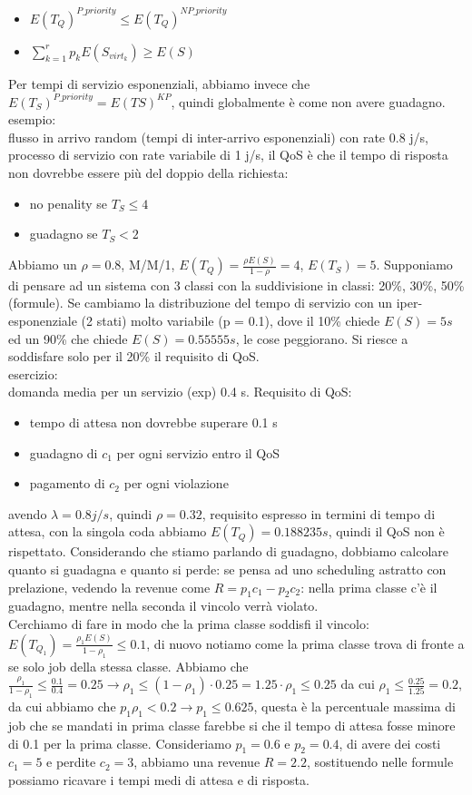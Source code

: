 \documentclass{article}
\begin{document}
\begin{itemize}
\item $E(T_Q)^{P\_priority} \leq E(T_Q)^{NP\_priority}$
\item $\sum\limits_{k=1}^{r} p_k E(S_{virt_k}) \geq E(S)$
\end{itemize}
Per tempi di servizio esponenziali, abbiamo invece che $E(T_S)^{P\_priority} = E(TS)^{KP}$, quindi globalmente è come non avere guadagno.\\ esempio: \\ flusso in arrivo random (tempi di inter-arrivo esponenziali) con rate 0.8 j/s, processo di servizio con rate variabile di 1 j/s, il QoS è che il tempo di risposta non dovrebbe essere più del doppio della richiesta:
\begin{itemize}
\item no penality se $T_S \leq 4$
\item guadagno se $T_S < 2$
\end{itemize}
Abbiamo un $\rho = 0.8$, M/M/1, $E(T_Q) = \frac{\rho E(S)}{1 - \rho} = 4$, $E(T_S) = 5$. Supponiamo di pensare ad un sistema con 3 classi con la suddivisione in classi: 20\%, 30\%, 50\% (formule). Se cambiamo la distribuzione del tempo di servizio con un iper-esponenziale (2 stati) molto variabile (p = 0.1), dove il 10\% chiede $E(S) = 5 s$ ed un 90\% che chiede $E(S) = 0.55555 s$, le cose peggiorano. Si riesce a soddisfare solo per il 20\% il requisito di QoS.\\ esercizio: \\ domanda media per un servizio (exp) 0.4 s. Requisito di QoS:
\begin{itemize}
\item tempo di attesa non dovrebbe superare 0.1 s
\item guadagno di $c_1$ per ogni servizio entro il QoS
\item pagamento di $c_2$ per ogni violazione
\end{itemize}
avendo $\lambda = 0.8 j/s$, quindi $\rho = 0.32$, requisito espresso in termini di tempo di attesa, con la singola coda abbiamo $E(T_Q) = 0.188235 s$, quindi il QoS non è rispettato. Considerando che stiamo parlando di guadagno, dobbiamo calcolare quanto si guadagna e quanto si perde: se pensa ad uno scheduling astratto con prelazione, vedendo la revenue come $R = p_1c_1 - p_2c_2$: nella prima classe c'è il guadagno, mentre nella seconda il vincolo verrà violato.\\ Cerchiamo di fare in modo che la prima classe soddisfi il vincolo: $E(T_{Q_1}) = \frac{\rho_1 E(S)}{1 - \rho_1} \leq 0.1$, di nuovo notiamo come la prima classe trova di fronte a se solo job della stessa classe. Abbiamo che $\frac{\rho_1}{1 - \rho_1} \leq \frac{0.1}{0.4} = 0.25 \rightarrow \rho_1 \leq (1 - \rho_1)\cdot 0.25 = 1.25\cdot \rho_1 \leq 0.25$ da cui $\rho_1 \leq \frac{0.25}{1.25} = 0.2$, da cui abbiamo che $p_1 \rho_1 < 0.2 \rightarrow p_1 \leq 0.625$, questa è la percentuale massima di job che se mandati in prima classe farebbe si che il tempo di attesa fosse minore di 0.1 per la prima classe. Consideriamo $p_1 = 0.6$ e $p_2 = 0.4$, di avere dei costi $c_1 = 5$ e perdite $c_2 = 3$, abbiamo una revenue $R = 2.2$, sostituendo nelle formule possiamo ricavare i tempi medi di attesa e di risposta.
\end{document}
